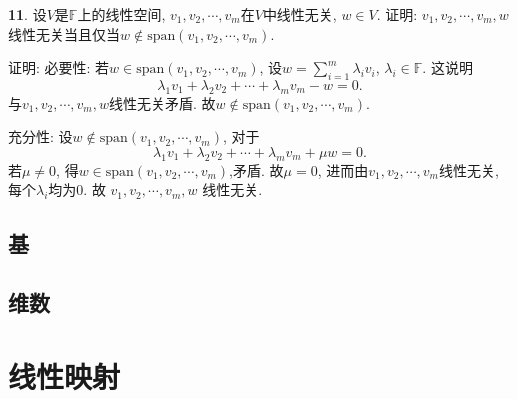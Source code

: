 \par \textbf{11}. 设$V$是$\mathbb{F}$上的线性空间, $v_1,v_2,\cdots,v_m$在$V$中线性无关, $w\in V$. 证明: $v_1,v_2,\cdots,v_m,w$线性无关当且仅当$w \notin \text{span}(v_1,v_2,\cdots,v_m)$.
\par 证明: 必要性: 若$w \in \text{span}(v_1,v_2,\cdots,v_m)$, 设$w=\sum_{i=1}^m \lambda_i v_i$, $\lambda_i \in \mathbb{F}$. 这说明
\begin{displaymath}
\lambda_1 v_1+\lambda_2 v_2+\cdots+\lambda_m v_m-w=0.
\end{displaymath}
与$v_1,v_2,\cdots,v_m,w$线性无关矛盾. 故$w \notin \text{span}(v_1,v_2,\cdots,v_m)$.
\par 充分性: 设$w \notin \text{span}(v_1,v_2,\cdots,v_m)$, 对于
\begin{displaymath}
\lambda_1 v_1+\lambda_2 v_2+\cdots+\lambda_m v_m+\mu w=0.
\end{displaymath}
若$\mu \neq 0$, 得$w \in \text{span}(v_1,v_2,\cdots,v_m)$,矛盾. 故$\mu=0$, 进而由$v_1,v_2,\cdots,v_m$线性无关, 每个$\lambda_i$均为0. 故 $v_1,v_2,\cdots,v_m,w$ 线性无关.

\subsection{基}

\subsection{维数}

\section{线性映射}